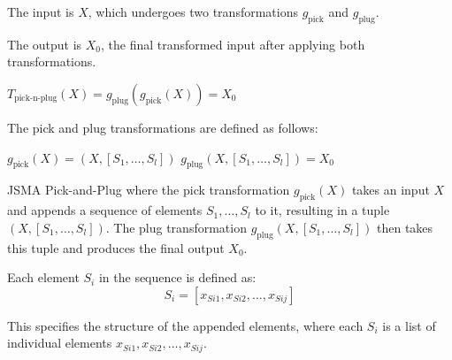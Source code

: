 The input is \(X\), which undergoes two transformations \(g_{\text{pick}}\) and \(g_{\text{plug}}\).

The output is \(X_0\), the final transformed input after applying both transformations.

$T_{\text{pick-n-plug}}(X) = g_{\text{plug}}(g_{\text{pick}}(X)) = X_0$

The pick and plug transformations are defined as follows:

$g_{\text{pick}}(X) = (X, [S_1, \ldots, S_l])$
$g_{\text{plug}}(X, [S_1, \ldots, S_l]) = X_0$

JSMA Pick-and-Plug where the pick transformation \(g_{\text{pick}}(X)\) takes an input \(X\) and appends a sequence of elements \(S_1, \ldots, S_l\) to it, resulting in a tuple \((X, [S_1, \ldots, S_l])\). The plug transformation \(g_{\text{plug}}(X, [S_1, \ldots, S_l])\) then takes this tuple and produces the final output \(X_0\). 

Each element \(S_i\) in the sequence is defined as:
\begin{equation*}
S_i = [x_{Si1}, x_{Si2}, \ldots, x_{Sij}]
\end{equation*}

This specifies the structure of the appended elements, where each \(S_i\) is a list of individual elements \(x_{Si1}, x_{Si2}, \ldots, x_{Sij}\).
